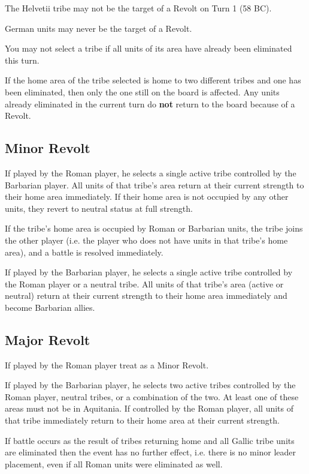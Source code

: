 The Helvetii tribe may not be the target of a Revolt on Turn 1 (58 BC).

German units may never be the target of a Revolt.

You may not select a tribe if all units of its area have already been eliminated this turn.

If the home area of the tribe selected is home to two different tribes and one has been eliminated, then only the one still on the board is affected. Any units already eliminated in the current turn do \textbf{not} return to the board because of a Revolt.

\subsection{Minor Revolt}
If played by the Roman player, he selects a single active tribe controlled
by the Barbarian player. All units of that tribe's area return at their current strength to their home area immediately. If their home area is not occupied by any other units, they revert to neutral status at full strength.

If the tribe’s home area is occupied by Roman or Barbarian units, the tribe joins the other player (i.e. the player who does not have units in that tribe’s home area), and a battle is resolved immediately.

If played by the Barbarian player, he selects a single active tribe
controlled by the Roman player or a neutral tribe. All units of that
tribe's area (active or neutral) return at their current strength to their home area immediately and become Barbarian allies.

\subsection{Major Revolt}
If played by the Roman player treat as a Minor Revolt.

If played by the Barbarian player, he selects two active tribes controlled by the Roman player, neutral tribes, or a combination of the two. At least one of these areas must not be in Aquitania. If controlled by the Roman player, all units of that tribe immediately return to their home area at their current strength.

If battle occurs as the result of tribes returning home and all Gallic tribe units are eliminated then the event has no further effect, i.e. there is no minor leader placement, even if all Roman units were eliminated as well.

